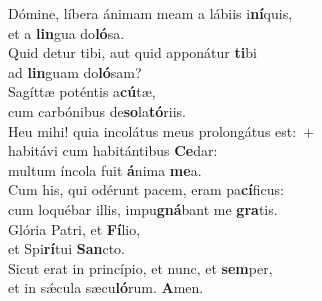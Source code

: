 \evenverse Dómine, líbera ánimam meam a lábiis i\textbf{ní}quis,~\*\\
\evenverse et a \textbf{lin}gua do\textbf{ló}sa.\\
\oddverse Quid detur tibi, aut quid apponátur \textbf{ti}bi~\*\\
\oddverse ad \textbf{lin}guam do\textbf{ló}sam?\\
\evenverse Sagíttæ poténtis a\textbf{cú}tæ,~\*\\
\evenverse cum carbónibus de\textbf{so}la\textbf{tó}riis.\\
\oddverse Heu mihi! quia incolátus meus prolongátus est:~+\\
\oddverse  habitávi cum habitántibus \textbf{Ce}dar:~\*\\
\oddverse multum íncola fuit \textbf{á}nima \textbf{me}a.\\
\evenverse Cum his, qui odérunt pacem, eram pa\textbf{cí}ficus:~\*\\
\evenverse cum loquébar illis, impu\textbf{gná}bant me \textbf{gra}tis.\\
\oddverse Glória Patri, et \textbf{Fí}lio,~\*\\
\oddverse et Spi\textbf{rí}tui \textbf{San}cto.\\
\evenverse Sicut erat in princípio, et nunc, et \textbf{sem}per,~\*\\
\evenverse et in sǽcula sæcu\textbf{ló}rum. \textbf{A}men.\\

